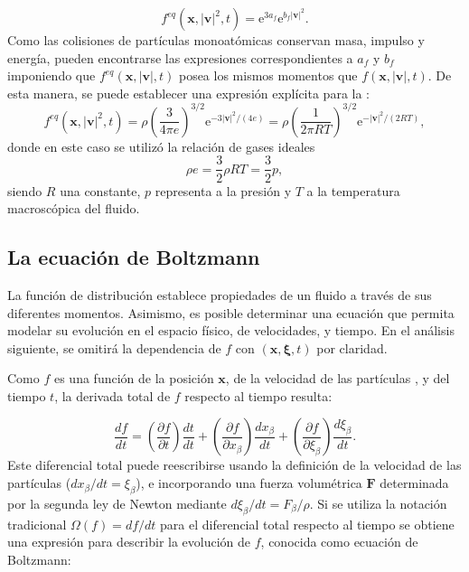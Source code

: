 \begin{equation}
	f^{eq}(\bm{x},|\bm{v}|^2,t) = \mbox{e}^{3a_f}\mbox{e}^{b_f|\bm{v}|^2}.
\end{equation}
Como las colisiones de part\'iculas monoat\'omicas conservan masa, impulso y energ\'ia, pueden encontrarse las expresiones correspondientes a $a_f$ y $b_f$ imponiendo que $f^{eq}(\bm{x},|\bm{v}|,t)$ posea los mismos momentos que $f(\bm{x},|\bm{v}|,t)$. De esta manera, se puede establecer una expresi\'on expl\'icita para la \edf{}:
\begin{equation}
	f^{eq}(\bm{x},|\bm{v}|^2,t) 
	= \rho \left( \dfrac{3}{4\pi e} \right)^{3/2} \mbox{e}^{-3|\bm{v}|^2/(4e)}
	= \rho \left( \dfrac{1}{2\pi RT} \right)^{3/2} \mbox{e}^{-|\bm{v}|^2/(2RT)},
\end{equation}
donde en este caso se utiliz\'o la relaci\'on de gases ideales
\begin{equation}
	\rho e = \frac{3}{2}\rho RT=\frac{3}{2}p,
\end{equation}
siendo $R$ una constante, $p$ representa a la presi\'on y $T$ a la temperatura macrosc\'opica del fluido.


\subsection{La ecuaci\'on de Boltzmann}
\label{sec:ec_boltz}
La funci\'on de distribuci\'on \fvar{} establece propiedades de un fluido a trav\'es de sus diferentes momentos. Asimismo, es posible determinar una ecuaci\'on que permita modelar su evoluci\'on en el espacio f\'isico, de velocidades, y tiempo. En el an\'alisis siguiente, se omitir\'a la dependencia de $f$ con $(\bm{x}, \bm{\xi}, t)$ por claridad.
\par
Como $f$ es una funci\'on de la posici\'on $\bm{x}$, de la velocidad de las part\'iculas \bxi{}, y del tiempo $t$, la derivada total de $f$ respecto al tiempo resulta:

\begin{equation}
	\dfrac{df}{dt} = \left( \dfrac{\partial f}{\partial t} \right) \dfrac{dt}{dt}
	               + \left( \dfrac{\partial f}{\partial x_{\beta}} \right) \dfrac{dx_{\beta}}{dt}
	               + \left( \dfrac{\partial f}{\partial \xi_{\beta}} \right) \dfrac{d\xi_{\beta}}{dt}.
\end{equation}
Este diferencial total puede reescribirse usando la definici\'on de la velocidad de las part\'iculas ($dx_{\beta}/dt = \xi_{\beta}$), e incorporando una fuerza volum\'etrica $\bm{F}$ determinada por la segunda ley de Newton mediante $d\xi_{\beta}/dt = F_{\beta}/\rho$. Si se utiliza la notaci\'on tradicional $\Omega (f) = df/dt$ para el diferencial total respecto al tiempo se obtiene una expresi\'on para describir la evoluci\'on de $f$, conocida como ecuaci\'on de Boltzmann:

